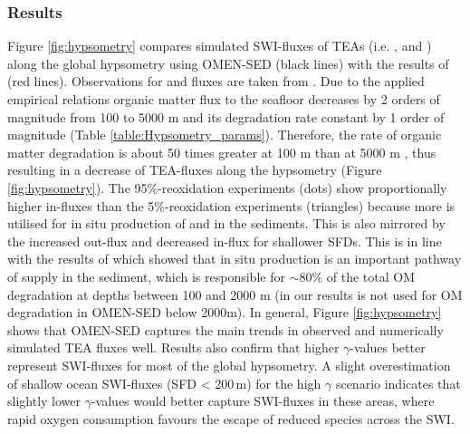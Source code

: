 \documentclass[gmd, manuscript]{copernicus}
\begin{document}
\subsubsection{Results}
Figure \ref{fig:hypsometry} compares simulated SWI-fluxes of TEAs (i.e. ,  and ) along the global hypsometry using OMEN-SED (black lines) with the results of \citet{thullner_global_scale_2009} 
(red lines). 
Observations for  and  fluxes are taken from \citet{middelburg_denitrification_1996}. 
Due to the applied empirical relations organic matter flux to the seafloor decreases by 2 orders of magnitude from 100 to 5000 m and its degradation rate constant by 1 order of magnitude (Table \ref{table:Hypsometry_params}). 
Therefore, the rate of organic matter degradation is about 50 times greater at 100 m than at 5000 m \citep[compare][]{thullner_global_scale_2009}, thus resulting in a decrease of TEA-fluxes along the 
hypsometry (Figure \ref{fig:hypsometry}). 
The 95\%-reoxidation experiments (dots) show proportionally higher  in-fluxes than the 5\%-reoxidation experiments (triangles) because more  is utilised for 
in situ production of  and  in the sediments. This is also mirrored by the increased  out-flux and decreased  in-flux for shallower SFDs. 
This is in line with the results of \citet{thullner_global_scale_2009} which showed that in situ production is an important pathway of  supply in the sediment, which is responsible for $\sim$80\% of the total OM degradation at depths 
between 100 and 2000 m (in our results  is not used for OM degradation in OMEN-SED below 2000m).
In general, Figure \ref{fig:hypsometry} shows that OMEN-SED captures the main trends in observed and numerically simulated TEA fluxes well. Results also confirm that higher $\gamma$-values better represent SWI-fluxes for most of the global hypsometry. 
A slight overestimation of shallow ocean SWI-fluxes (SFD < 200\,m) for the high $\gamma$ scenario indicates that slightly lower $\gamma$-values would better capture SWI-fluxes in these areas, where rapid oxygen consumption favours the 
escape of reduced species across the SWI.
\end{document}
